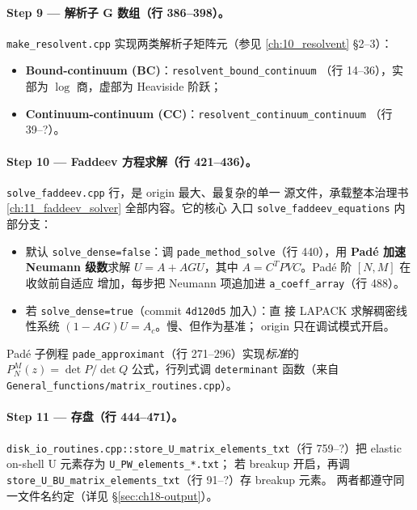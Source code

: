 \paragraph{Step 9 — 解析子 G 数组（行 386--398）。}
\texttt{make\_resolvent.cpp} 实现两类解析子矩阵元（参见
\cref{ch:10_resolvent} §2--3）：
\begin{itemize}
\item \textbf{Bound-continuum (BC)}：\texttt{resolvent\_bound\_continuum}
      （行 14--36），实部为 $\log$ 商，虚部为 Heaviside 阶跃；
\item \textbf{Continuum-continuum (CC)}：\texttt{resolvent\_continuum\_continuum}
      （行 39--?）。
\end{itemize}

\paragraph{Step 10 — Faddeev 方程求解（行 421--436）。}
\texttt{solve\_faddeev.cpp} 行，是 origin 最大、最复杂的单一
源文件，承载整本治理书 \cref{ch:11_faddeev_solver} 全部内容。它的核心
入口 \texttt{solve\_faddeev\_equations} 内部分支：
\begin{itemize}
\item 默认 \texttt{solve\_dense=false}：调
      \texttt{pade\_method\_solve}（行 440），用
      \textbf{Padé 加速 Neumann 级数}求解
      $U = A + AGU$，其中 $A = C^T PVC$。Padé 阶 $[N,M]$ 在收敛前自适应
      增加，每步把 Neumann 项追加进 \texttt{a\_coeff\_array}（行 488）。
\item 若 \texttt{solve\_dense=true}（commit \texttt{4d120d5} 加入）：直
      接 LAPACK 求解稠密线性系统 $(1 - AG) U = A_c$。慢、但作为基准；
      origin 只在调试模式开启。
\end{itemize}
Padé 子例程 \texttt{pade\_approximant}（行 271--296）实现\emph{标准}的
$P_N^M(z) = \det P / \det Q$ 公式，行列式调
\texttt{determinant} 函数（来自 \texttt{General\_functions/matrix\_routines.cpp}）。

\paragraph{Step 11 — 存盘（行 444--471）。}
\texttt{disk\_io\_routines.cpp::store\_U\_matrix\_elements\_txt}\;（行
759--?）把 elastic on-shell U 元素存为 \texttt{U\_PW\_elements\_*.txt}；
若 breakup 开启，再调
\texttt{store\_U\_BU\_matrix\_elements\_txt}（行 91--?）存 breakup 元素。
两者都遵守同一文件名约定（详见 §\ref{sec:ch18-output}）。

